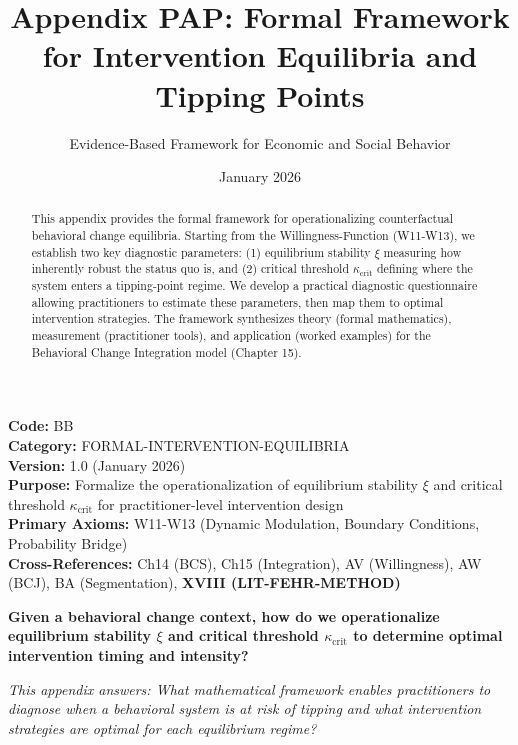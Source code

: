 \documentclass[11pt, a4paper]{article}
\title{Appendix PAP: Formal Framework for Intervention Equilibria and Tipping Points}
\author{Evidence-Based Framework for Economic and Social Behavior}
\date{January 2026}
\begin{document}
\maketitle


\begin{tcolorbox}[colback=gray!10!white, colframe=gray!75!black, title=Appendix Metadata]
\textbf{Code:} BB \\
\textbf{Category:} FORMAL-INTERVENTION-EQUILIBRIA \\
\textbf{Version:} 1.0 (January 2026) \\
\textbf{Purpose:} Formalize the operationalization of equilibrium stability $\xi$ and critical threshold $\kappa_{\text{crit}}$
for practitioner-level intervention design \\
\textbf{Primary Axioms:} W11-W13 (Dynamic Modulation, Boundary Conditions, Probability Bridge) \\
\textbf{Cross-References:} Ch14 (BCS), Ch15 (Integration), AV (Willingness),
AW (BCJ), BA (Segmentation), \textbf{XVIII (LIT-FEHR-METHOD)} \\
\end{tcolorbox}

\begin{abstract}
This appendix provides the formal framework for operationalizing counterfactual behavioral change equilibria.
Starting from the Willingness-Function (W11-W13), we establish two key diagnostic parameters:
(1) equilibrium stability $\xi$ measuring how inherently robust the status quo is, and
(2) critical threshold $\kappa_{\text{crit}}$ defining where the system enters a tipping-point regime.
We develop a practical diagnostic questionnaire allowing practitioners to estimate these parameters,
then map them to optimal intervention strategies. The framework synthesizes theory (formal mathematics),
measurement (practitioner tools), and application (worked examples) for the Behavioral Change Integration model (Chapter 15).
\end{abstract}


\begin{tcolorbox}[colback=blue!5!white, colframe=blue!75!black,
    title=\textbf{Fundamental Question}]
\textbf{Given a behavioral change context, how do we operationalize equilibrium stability $\xi$
and critical threshold $\kappa_{\text{crit}}$ to determine optimal intervention timing and intensity?}

\medskip
\textit{This appendix answers: What mathematical framework enables practitioners to diagnose
when a behavioral system is at risk of tipping and what intervention strategies are optimal
for each equilibrium regime?}
\end{tcolorbox}
\end{document}
